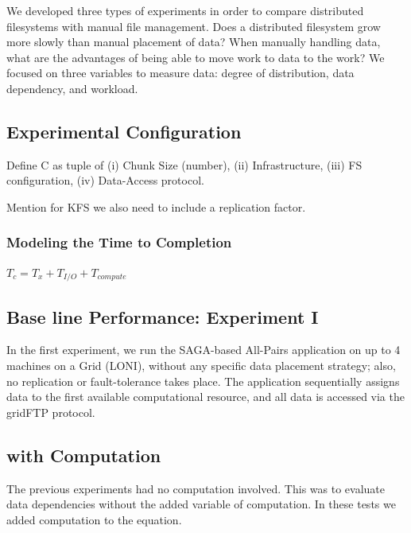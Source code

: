 \documentclass{rspublic}
\begin{document}
We developed three types of experiments in order to compare
distributed filesystems with manual file management.  Does a
distributed filesystem grow more slowly than manual placement of data?
When manually handling data, what are the advantages of being able to
move work to data to the work?  We focused on three variables to
measure data: degree of distribution, data dependency, and workload.

\subsection{Experimental Configuration}

Define C as  tuple of (i) Chunk Size (number), (ii) Infrastructure,
(iii) FS configuration, (iv) Data-Access protocol.

Mention for KFS we also need to include a replication factor.

\subsubsection{Modeling the Time to Completion}

$T_c = T_x + T_{I/O} + T_{compute}$

\subsection{Base line Performance: Experiment I} In the first experiment, we run the
SAGA-based All-Pairs application on up to 4 machines on a Grid (LONI),
without any specific data placement strategy; also, no replication or
fault-tolerance takes place.  The application sequentially assigns
data to the first available computational resource, and all data is
accessed via the gridFTP protocol.

\subsection{with Computation}
The previous experiments had no computation involved.  This was to
evaluate data dependencies without the added variable of computation.
In these tests we added computation to the equation.

 

\end{document}
